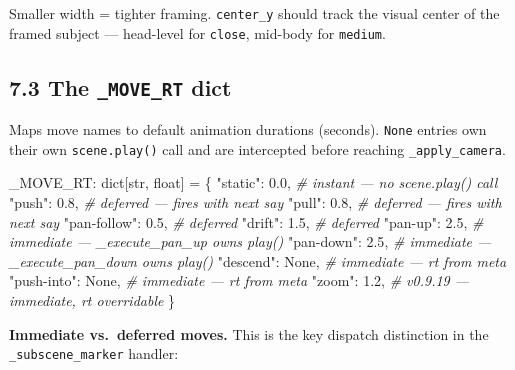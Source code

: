 \documentclass[
  11pt,
]{book}
\newenvironment{Shaded}{}{}
\newcommand{\BuiltInTok}[1]{\textcolor[rgb]{0.00,0.50,0.00}{#1}}
\newcommand{\CommentTok}[1]{\textcolor[rgb]{0.38,0.63,0.69}{\textit{#1}}}
\newcommand{\FloatTok}[1]{\textcolor[rgb]{0.25,0.63,0.44}{#1}}
\newcommand{\NormalTok}[1]{#1}
\newcommand{\OperatorTok}[1]{\textcolor[rgb]{0.40,0.40,0.40}{#1}}
\newcommand{\StringTok}[1]{\textcolor[rgb]{0.25,0.44,0.63}{#1}}
\newcommand{\VariableTok}[1]{\textcolor[rgb]{0.10,0.09,0.49}{#1}}
\begin{document}
Smaller width = tighter framing. \texttt{center\_y} should track the
visual center of the framed subject --- head-level for \texttt{close},
mid-body for \texttt{medium}.

\subsection{\texorpdfstring{7.3 The \texttt{\_MOVE\_RT}
dict}{7.3 The \_MOVE\_RT dict}}\label{the-_move_rt-dict}

Maps move names to default animation durations (seconds). \texttt{None}
entries own their own \texttt{scene.play()} call and are intercepted
before reaching \texttt{\_apply\_camera}.

\begin{Shaded}
\begin{Highlighting}[]
\NormalTok{\_MOVE\_RT: }\BuiltInTok{dict}\NormalTok{[}\BuiltInTok{str}\NormalTok{, }\BuiltInTok{float}\NormalTok{] }\OperatorTok{=}\NormalTok{ \{}
    \StringTok{"static"}\NormalTok{:     }\FloatTok{0.0}\NormalTok{,    }\CommentTok{\# instant — no scene.play() call}
    \StringTok{"push"}\NormalTok{:       }\FloatTok{0.8}\NormalTok{,    }\CommentTok{\# deferred — fires with next say}
    \StringTok{"pull"}\NormalTok{:       }\FloatTok{0.8}\NormalTok{,    }\CommentTok{\# deferred — fires with next say}
    \StringTok{"pan{-}follow"}\NormalTok{: }\FloatTok{0.5}\NormalTok{,    }\CommentTok{\# deferred}
    \StringTok{"drift"}\NormalTok{:      }\FloatTok{1.5}\NormalTok{,    }\CommentTok{\# deferred}
    \StringTok{"pan{-}up"}\NormalTok{:     }\FloatTok{2.5}\NormalTok{,    }\CommentTok{\# immediate — \_execute\_pan\_up owns play()}
    \StringTok{"pan{-}down"}\NormalTok{:   }\FloatTok{2.5}\NormalTok{,    }\CommentTok{\# immediate — \_execute\_pan\_down owns play()}
    \StringTok{"descend"}\NormalTok{:    }\VariableTok{None}\NormalTok{,   }\CommentTok{\# immediate — rt from meta}
    \StringTok{"push{-}into"}\NormalTok{:  }\VariableTok{None}\NormalTok{,   }\CommentTok{\# immediate — rt from meta}
    \StringTok{"zoom"}\NormalTok{:       }\FloatTok{1.2}\NormalTok{,    }\CommentTok{\# v0.9.19 — immediate, rt overridable}
\NormalTok{\}}
\end{Highlighting}
\end{Shaded}

\textbf{Immediate vs.\ deferred moves.} This is the key dispatch
distinction in the \texttt{\_subscene\_marker} handler:
\end{document}
